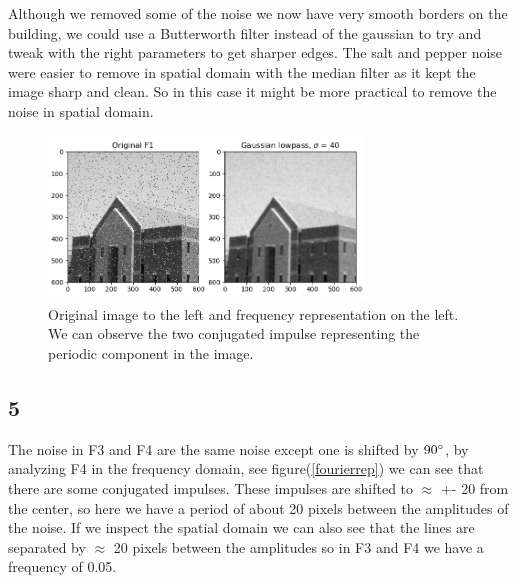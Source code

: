 {    Although we removed some of the noise we now have very smooth borders on the building, we could use a Butterworth filter instead of the gaussian to try and tweak with the right parameters to get sharper edges. The salt and pepper noise were easier to remove in spatial domain with the median filter as it kept the image sharp and clean. So in this case it might be more practical to remove the noise in spatial domain.

    \begin{figure}[H]
        {\centering
            \includegraphics[width=0.75\textwidth]{task4pepper.png}
            \caption{Original image to the left and frequency representation on the left. We can observe the two conjugated impulse representing the periodic component in the image.}
            \label{task4pepper}
        \par}
        \end{figure}


\subsection{5}


The noise in F3 and F4 are the same noise except one is shifted by $90\degree$, by analyzing F4 in the frequency domain, see figure(\ref{fourierrep}) we can see that there are some conjugated impulses. These impulses are shifted to $\approx$ +- 20 from the center, so here we have a period of about 20 pixels between the amplitudes of the noise. If we inspect the spatial domain we can also see that the lines are separated by $\approx$ 20 pixels between the amplitudes so in F3 and F4 we have a frequency of 0.05.

}
